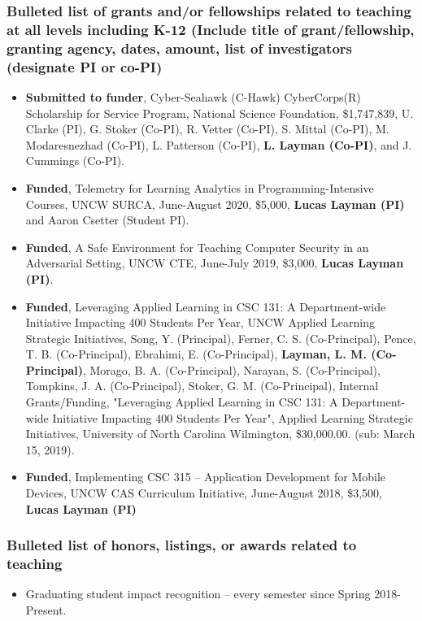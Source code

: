 \documentclass[10pt]{article}
\begin{document}
\subsubsection{Bulleted list of grants and/or fellowships related to teaching at all levels including K-12 (Include title of grant/fellowship, granting agency, dates, amount, list of investigators (designate PI or co-PI)}
\begin{itemize}
    \item \textbf{Submitted to funder}, Cyber-Seahawk (C-Hawk) CyberCorps(R) Scholarship for Service Program, National Science Foundation,  \$1,747,839, U. Clarke (PI), G. Stoker (Co-PI), R. Vetter (Co-PI), S. Mittal (Co-PI), M. Modaresnezhad (Co-PI), L. Patterson (Co-PI), \textbf{L. Layman (Co-PI)}, and J. Cummings (Co-PI).
    \item \textbf{Funded}, Telemetry for Learning Analytics in Programming-Intensive Courses, UNCW SURCA, June-August 2020, \$5,000, \textbf{Lucas Layman (PI)} and Aaron Csetter (Student PI).
    \item \textbf{Funded}, A Safe Environment for Teaching Computer Security in an Adversarial Setting, UNCW CTE, June-July 2019, \$3,000, \textbf{Lucas Layman (PI)}.
    \item \textbf{Funded}, Leveraging Applied Learning in CSC 131: A Department-wide Initiative Impacting 400 Students Per Year, UNCW Applied Learning Strategic Initiatives,  Song, Y. (Principal), Ferner, C. S. (Co-Principal), Pence, T. B. (Co-Principal), Ebrahimi, E. (Co-Principal), \textbf{Layman, L. M. (Co-Principal)}, Morago, B. A. (Co-Principal), Narayan, S. (Co-Principal), Tompkins, J. A. (Co-Principal), Stoker, G. M. (Co-Principal), Internal Grants/Funding, "Leveraging Applied Learning in CSC 131: A Department-wide Initiative Impacting 400 Students Per Year", Applied Learning Strategic Initiatives, University of North Carolina Wilmington, \$30,000.00. (sub: March 15, 2019).
    \item \textbf{Funded}, Implementing CSC 315 – Application Development for Mobile Devices, UNCW CAS Curriculum Initiative, June-August 2018, \$3,500, \textbf{Lucas Layman (PI)}
\end{itemize}

\subsubsection{Bulleted list of honors, listings, or awards related to teaching}
    \begin{itemize}
        \item Graduating student impact recognition -- every semester since Spring 2018-Present.
    \end{itemize}
    
\end{document}
